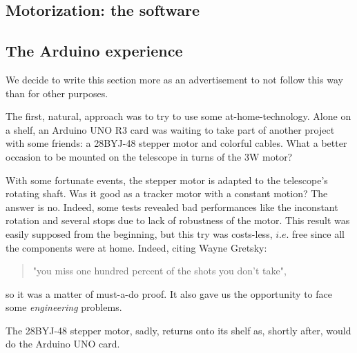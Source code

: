 \documentclass{article}
\begin{document}
\begin{multicols}{2}
        \section{Motorization: the software}
        \subsection{The Arduino experience}
        We decide to write this section more as an advertisement to not follow this way than for other purposes.

        The first, natural, approach was to try to use some at-home-technology.
        Alone on a shelf, an Arduino UNO R3 card was waiting to take part of another project with some friends: a 28BYJ-48 stepper motor and colorful cables.
        What a better occasion to be mounted on the telescope in turns of the 3W motor?

        With some fortunate events, the stepper motor is adapted to the telescope's rotating shaft.
        Was it good as a tracker motor with a constant motion?
        The answer is no.
        Indeed, some tests revealed bad performances like the inconstant rotation and several stops due to lack of robustness of the motor.
        This result was easily supposed from the beginning, but this try was costs-less, \(i.e.\) free since all the components were at home.
        Indeed, citing Wayne Gretsky:
        \begin{quote}
            "you miss one hundred percent of the shots you don't take",
        \end{quote}
        so it was a matter of must-a-do proof.
        It also gave us the opportunity to face some \textit{engineering} problems.

        The 28BYJ-48 stepper motor, sadly, returns onto its shelf as, shortly after, would do the Arduino UNO card.


\end{multicols}
\end{document}
